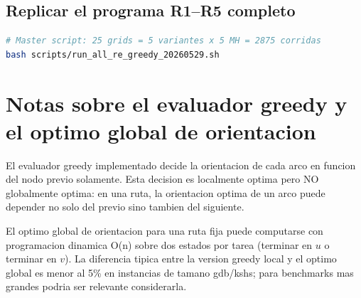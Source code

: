 \subsection{Replicar el programa R1--R5 completo}

\begin{lstlisting}[language=bash]
# Master script: 25 grids = 5 variantes x 5 MH = 2875 corridas
bash scripts/run_all_re_greedy_20260529.sh
\end{lstlisting}

\section{Notas sobre el evaluador greedy y el optimo global de orientacion}

El evaluador greedy implementado decide la orientacion de cada arco en
funcion del nodo previo solamente. Esta decision es localmente optima
pero NO globalmente optima: en una ruta, la orientacion optima de un
arco puede depender no solo del previo sino tambien del siguiente.

El optimo global de orientacion para una ruta fija puede computarse
con programacion dinamica O(n) sobre dos estados por tarea (terminar
en $u$ o terminar en $v$). La diferencia tipica entre la version
greedy local y el optimo global es menor al 5\% en instancias de
tamano gdb/kshs; para benchmarks mas grandes podria ser relevante
considerarla.

